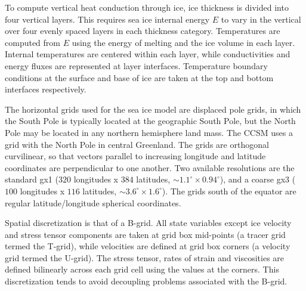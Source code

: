 \vskip 8pt

To compute vertical heat conduction through ice, ice thickness is divided into four
vertical layers. This requires sea ice internal energy $E$ to vary in the 
vertical over four evenly spaced layers in each thickness category. Temperatures are computed 
from $E$ using the energy of melting and the ice volume in each layer. Internal temperatures 
are centered within each layer, while conductivities and energy fluxes are represented at 
layer interfaces. Temperature boundary conditions at the surface and base of ice are taken 
at the top and bottom interfaces respectively. 

\vskip 8pt

The horizontal grids used for the sea ice model are displaced pole grids, 
in which the South Pole is typically located at the geographic South Pole, but the North
Pole may be located in any northern hemisphere land mass. The CCSM uses a grid with
the North Pole in central Greenland. The grids are orthogonal curvilinear, so that vectors 
parallel to increasing longitude and latitude coordinates are perpendicular to one 
another. Two available resolutions are the standard gx1 ($320$ longitudes x $384$ latitudes,
$\sim 1.1^\circ \times 0.94^\circ$), and a coarse gx3 ($100$ longitudes x $116$ latitudes,
$\sim 3.6^\circ \times 1.6^\circ$). The grids south of the equator are regular 
latitude/longitude spherical coordinates.

Spatial discretization is that of a B-grid. All state 
variables except ice velocity and stress tensor components are taken at grid box 
mid-points (a tracer grid termed the T-grid), while velocities are defined at grid box corners 
(a velocity grid termed the U-grid). The stress tensor, rates of strain and viscosities 
are defined bilinearly across each grid cell using the values at the corners. This
discretization tends to avoid decoupling problems associated with the B-grid. 

